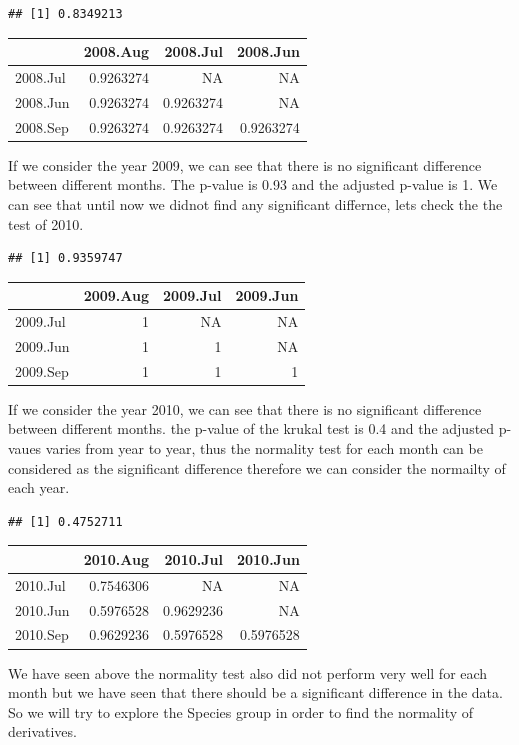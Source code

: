 \documentclass[
]{article}
\begin{document}
\begin{verbatim}
## [1] 0.8349213
\end{verbatim}

\begin{longtable}[]{@{}lrrr@{}}
\toprule
& 2008.Aug & 2008.Jul & 2008.Jun\tabularnewline
\midrule
\endhead
2008.Jul & 0.9263274 & NA & NA\tabularnewline
2008.Jun & 0.9263274 & 0.9263274 & NA\tabularnewline
2008.Sep & 0.9263274 & 0.9263274 & 0.9263274\tabularnewline
\bottomrule
\end{longtable}

If we consider the year 2009, we can see that there is no significant
difference between different months. The p-value is 0.93 and the
adjusted p-value is 1. We can see that until now we didnot find any
significant differnce, lets check the the test of 2010.

\begin{verbatim}
## [1] 0.9359747
\end{verbatim}

\begin{longtable}[]{@{}lrrr@{}}
\toprule
& 2009.Aug & 2009.Jul & 2009.Jun\tabularnewline
\midrule
\endhead
2009.Jul & 1 & NA & NA\tabularnewline
2009.Jun & 1 & 1 & NA\tabularnewline
2009.Sep & 1 & 1 & 1\tabularnewline
\bottomrule
\end{longtable}

If we consider the year 2010, we can see that there is no significant
difference between different months. the p-value of the krukal test is
0.4 and the adjusted p-vaues varies from year to year, thus the
normality test for each month can be considered as the significant
difference therefore we can consider the normailty of each year.

\begin{verbatim}
## [1] 0.4752711
\end{verbatim}

\begin{longtable}[]{@{}lrrr@{}}
\toprule
& 2010.Aug & 2010.Jul & 2010.Jun\tabularnewline
\midrule
\endhead
2010.Jul & 0.7546306 & NA & NA\tabularnewline
2010.Jun & 0.5976528 & 0.9629236 & NA\tabularnewline
2010.Sep & 0.9629236 & 0.5976528 & 0.5976528\tabularnewline
\bottomrule
\end{longtable}

We have seen above the normality test also did not perform very well for
each month but we have seen that there should be a significant
difference in the data. So we will try to explore the Species group in
order to find the normality of derivatives.
\end{document}
